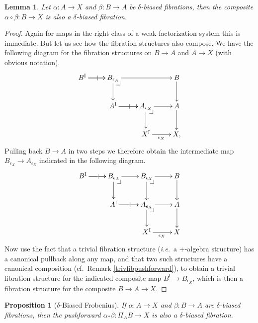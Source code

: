 \documentclass[11pt,reqno]{amsart}
\makeatletter
\newcommand{\ie}{\emph{i.e.}}
\newcommand{\ra}{\ensuremath{\rightarrow}}
\renewcommand{\to}{\ensuremath{\rightarrow}}
\newcommand{\I}{\ensuremath{\mathrm{I}}}
\newtheorem{proposition}[theorem]{Proposition}
\newtheorem{lemma}[theorem]{Lemma}
\theoremstyle{remark}
\theoremstyle{definition}
\newcommand{\pbcorner}[1][dr]{\save*!/#1-1.2pc/#1:(-1,1)@^{|-}\restore}
\makeatother
\begin{document}
\begin{lemma}\label{lemma:fibrationscompose}
Let  $\alpha : A \ra X$ and $\beta: B\ra A$ be $\delta$-biased fibrations, then the composite $\alpha\circ\beta : B \ra X$ is also a $\delta$-biased fibration.
\end{lemma}
\begin{proof}
Again for maps in the right class of a weak factorization system this is immediate.  But let us see how the fibration structures also compose.  We have the following diagram for the fibration structures on $B\ra A$ and $A\ra X$ (with obvious notation).
\begin{equation}\label{diagram:fibcomposition1}
\xymatrix{
B^\I \ar[r]|| \ar[r]  & B_{\epsilon_A} \ar[rr]  \ar[d] \pbcorner & & B \ar[d]\\
&A^\I \ar[r]|| \ar[r] & A_{\epsilon_X} \ar[d] \pbcorner \ar[r] & A \ar[d]\\
&& X^\I \ar[r]_{\epsilon_X} &  X,
}
\end{equation}
Pulling back $B\ra A$ in two steps we therefore obtain the intermediate map $B_{\epsilon_X} \to A_{\epsilon_X}$  indicated in the following diagram. 
\begin{equation}\label{diagram:fibcomposition2}
\xymatrix{
B^\I \ar[r]|| \ar[r]   & B_{\epsilon_A} \ar[r]  \ar[d] \pbcorner & B_{\epsilon_X}  \ar[d] \pbcorner \ar[r] & B \ar[d]\\
&A^\I \ar[r]|| \ar[r]  & A_{\epsilon_X} \ar[d] \pbcorner \ar[r] & A \ar[d]\\
&& X^\I \ar[r]_{\epsilon_X} &  X
}
\end{equation}
Now use the fact that a trivial fibration structure (\ie\ a +-algebra structure) has a canonical pullback along any map, and that two such structures have a canonical composition (cf.\ Remark \ref{trivfibpushforward}), to obtain a trivial fibration structure for the indicated composite map $B^\I \ra B_{\epsilon_X}$, which is then a fibration structure for the composite $B\to A\to X$.
\end{proof}

\begin{proposition}[$\delta$-Biased Frobenius]\label{prop:Frobenius}
If $\alpha : A \ra X$ and $\beta: B\ra A$  are $\delta$-biased fibrations, then the pushforward $\alpha_*\beta : \Pi_AB \ra X$ is also a $\delta$-biased fibration.
\end{proposition}
\end{document}
